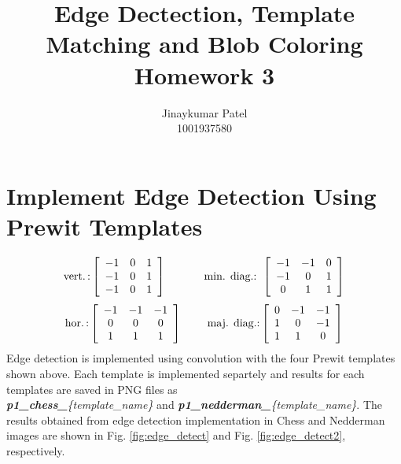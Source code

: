 \documentclass[12pt]{article}
\title{%
	Edge Dectection, Template Matching and Blob Coloring \\
	\large Homework 3 }
\author{Jinaykumar Patel \\ 1001937580}
\date{}
\begin{document}
	\maketitle
	
\section{Implement Edge Detection Using Prewit Templates}

$$
\operatorname{vert.:}\left[\begin{array}{lll}
	-1 & 0 & 1 \\
	-1 & 0 & 1 \\
	-1 & 0 & 1
\end{array}\right] \hspace{1.2cm}\text {min. diag.: }\left[\begin{array}{ccc}
-1 & -1 & 0 \\
-1 & 0 & 1 \\
0 & 1 & 1
\end{array}\right]
$$
$$
\operatorname{hor.: }\left[\begin{array}{ccc}
	-1 & -1 & -1 \\
	0 & 0 & 0 \\
	1 & 1 & 1
\end{array}\right] \hspace{0.8cm} \text {maj. diag.:}\left[\begin{array}{ccc}
	0 & -1 & -1 \\
	1 & 0 & -1 \\
	1 & 1 & 0
\end{array}\right] 
$$
Edge detection is implemented using convolution with the four Prewit templates shown above. Each template is implemented separtely and results for each templates are saved in PNG files as\\
\textit{\textbf{p1\_chess\_}\{template\_name\}} and \textit{\textbf{p1\_nedderman\_}\{template\_name\}}.
The results obtained from edge detection implementation in Chess and Nedderman images are shown in Fig. \ref{fig:edge_detect} and Fig. \ref{fig:edge_detect2}, respectively.
\end{document}
